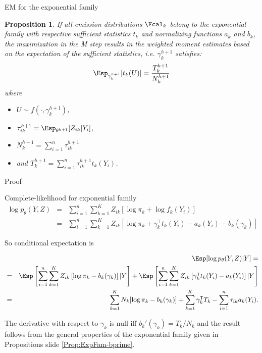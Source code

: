 \documentclass[compress,10pt]{beamer}
\newtheorem{proposition}{Proposition}
\begin{document}
\begin{frame}{EM for the exponential family}


\begin{proposition}
  If all emission distributions $\Fcal_k$ belong to the exponential family with respective sufficient statistics $t_k$ and normalizing functions $a_k$ and $b_k$,
  the maximization in the M step results in the weighted moment estimates based on the expectation of the sufficient statistics, i.e. ${\gamma}^{h+1}_k$ satisfies:
  $$
  \Esp_{{\gamma}^{h+1}_k}[t_k(U)] = \frac{T^{h+1}_k}{N^{h+1}_k}
  $$
  where 
  \begin{itemize}
   \item $U \sim f(\cdot, {\gamma}^{h+1}_k)$,
   \item $\tau^{h+1}_{ik} = \Esp_{{\theta}^{h+1}}[Z_{ik} | Y_i]$, 
   \item $N^{h+1}_k = \sum_{i=1}^n \tau^{h+1}_{ik}$
   \item  and $T^{h+1}_k = \sum_{i=1}^n\tau^{h+1}_{ik} t_k(Y_i)$.
  \end{itemize}
 
  
\end{proposition}
\end{frame}
\begin{frame}[allowframebreaks]{Proof}

Complete-likelihood for exponential family
\begin{eqnarray*}
 \log p_\theta(Y, Z) 
&=& \sum_{i=1}^n \sum_{k=1}^K Z_{ik} [\log \pi_k + \log f_k(Y_i)]\\
&=& \sum_{i=1}^n\sum_{k=1}^K Z_{ik} [\log \pi_k + \gamma_k^\intercal  t_k(Y_i) - a_k(Y_i) - b_k(\gamma_k)]
\end{eqnarray*}
 
So  conditional expectation is 
{\small \begin{eqnarray*}
&&\Esp[\log p_\theta(Y, Z) | Y]  = \\
&=& \Esp\left[\sum_{i=1}^n \sum_{k=1}^K Z_{ik} \left[\log \pi_k - b_k(\gamma_k)\right] | Y \right] + \Esp\left[\sum_{i=1}^n \sum_{k=1}^K Z_{ik} \left[\gamma_k^\intercal  t_k(Y_i) - a_k(Y_i)\right] | Y\right] \\
& = & \sum_{k=1}^K N_k [\log \pi_k - b_k(\gamma_k)] + \sum_{k=1}^K \gamma_k^\intercal  T_k - \sum_{i=1}^n \tau_{ik} a_k(Y_i).
\end{eqnarray*}

The derivative with respect to $\gamma_k$ is null iff $b_k'(\gamma_k) = T_k / N_k$ and the result follows from the general properties of the exponential family given in Propositions slide  \ref{Prop:ExpFam-bprime}.
}


\end{frame}
\end{document}
